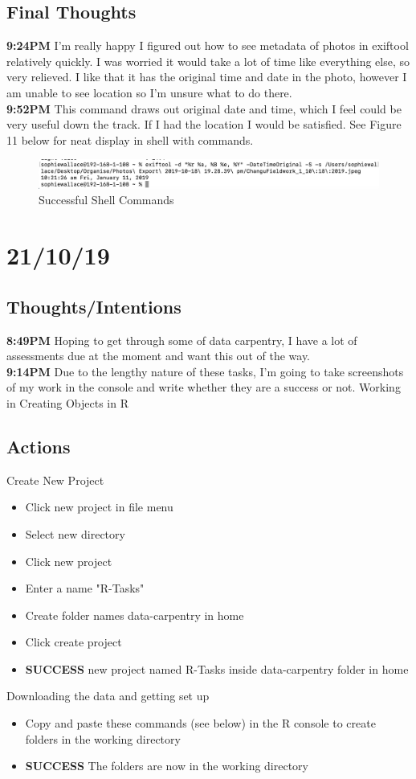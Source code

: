 \documentclass{article}
\begin{document}
\subsection{Final Thoughts}
\textbf{9:24PM} I'm really happy I figured out how to see metadata of photos in exiftool relatively quickly. I was worried it would take a lot of time like everything else, so very relieved. I like that it has the original time and date in the photo, however I am unable to see location so I'm unsure what to do there. \\
\textbf{9:52PM} This command draws out original date and time, which I feel could be very useful down the track. If I had the location I would be satisfied. See Figure 11 below for neat display in shell with commands. 

\begin{figure}[H]
    \centering
    \includegraphics[width=\textwidth]{Images/ExifTool_Command.png}
    \caption{Successful Shell Commands}
    \label{fig:my_label}
\end{figure}

\section{21/10/19}
\subsection{Thoughts/Intentions}
\textbf{8:49PM} Hoping to get through some of data carpentry, I have a lot of assessments due at the moment and want this out of the way. \\
\textbf{9:14PM} Due to the lengthy nature of these tasks, I'm going to take screenshots of my work in the console and write whether they are a success or not. Working in Creating Objects in R

\subsection{Actions}
Create New Project
\begin{itemize}
\item Click new project in file menu
\item Select new directory
\item Click new project
\item Enter a name "R-Tasks"
\item Create folder names data-carpentry in home 
\item Click create project
\item \textbf{SUCCESS} new project named R-Tasks inside data-carpentry folder in home
\end{itemize}
Downloading the data and getting set up
\begin{itemize}
\item Copy and paste these commands (see below) in the R console to create folders in the working directory
\item \textbf{SUCCESS} The folders are now in the working directory
\end{itemize} 
\end{document}
